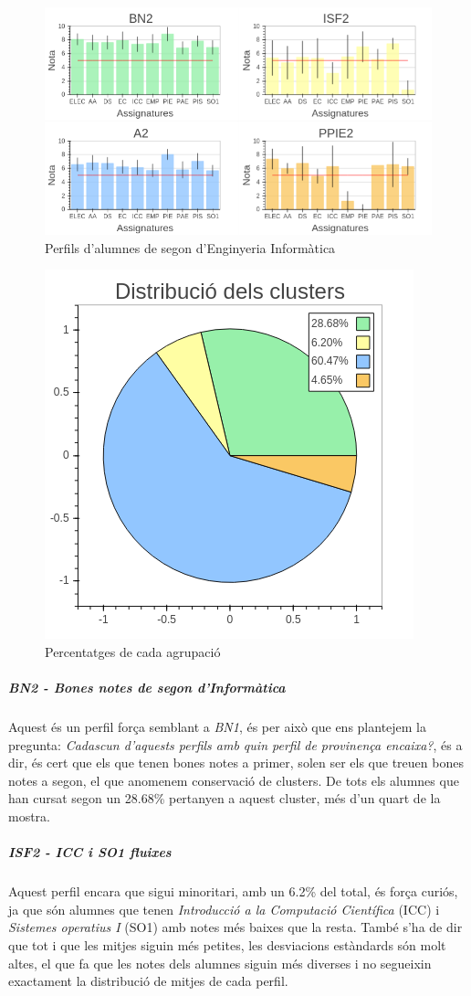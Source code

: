 \documentclass[12pt,a4paper,catalan]{article}
\begin{document}
\begin{figure}[h]
\centering
\includegraphics[width=.9\linewidth]{img/perfils_segon_info.png}
\caption{Perfils d'alumnes de segon d'Enginyeria Informàtica}
\end{figure}

\begin{figure}[h]
\centering
\includegraphics[width=.4\linewidth]{img/perfils_segon_info_pastilla.png}
\caption{Percentatges de cada agrupació}
\end{figure}

\subparagraph{BN2 - Bones notes de segon d'Informàtica}
Aquest és un perfil força semblant a \textit{BN1}, és per això que ens plantejem la pregunta: \textit{Cadascun d'aquests perfils amb quin perfil de provinença encaixa?}, és a dir, és cert que els que tenen bones notes a primer, solen ser els que treuen bones notes a segon, el que anomenem conservació de clusters. De tots els alumnes que han cursat segon un 28.68\% pertanyen a aquest cluster, més d'un quart de la mostra.

\subparagraph{ISF2 - ICC i SO1 fluixes}
Aquest perfil encara que sigui minoritari, amb un 6.2\% del total, és força curiós, ja que són alumnes que tenen \textit{Introducció a la Computació Científica} (ICC) i \textit{Sistemes operatius I} (SO1) amb notes més baixes que la resta. També s'ha de dir que tot i que les mitjes siguin més petites, les desviacions estàndards són molt altes, el que fa que les notes dels alumnes siguin més diverses i no segueixin exactament la distribució de mitjes de cada perfil.
\end{document}
